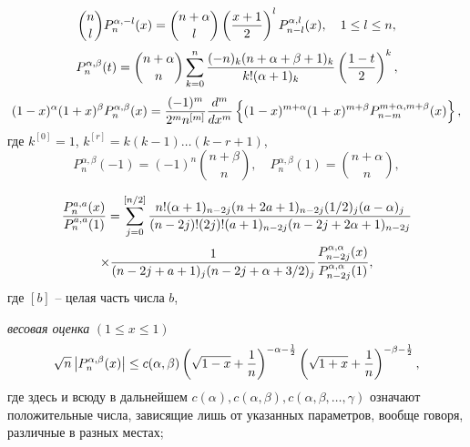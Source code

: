  \begin{equation}\label{Haar-Tcheb-eq5.6}
 {n\choose l}P_n^{\alpha,-l}(x)= {n+\alpha\choose
l}\left({x+1\over2}\right)^lP_{n-l}^{\alpha,l}(x),
     \quad 1\le l \le n,
\end{equation}
\begin{equation}\label{Haar-Tcheb-eq5.7}
P_n^{\alpha,\beta}(t) ={n+\alpha\choose n}
\sum_{k=0}^n{(-n)_k(n+\alpha+\beta+1)_k\over k!(\alpha+1)_k}
\left({1-t\over 2}\right)^k,
\end{equation}
\begin{equation}\label{Haar-Tcheb-eq5.8}
(1-x)^\alpha(1+x)^\beta P_n^{\alpha,\beta}(x)
={(-1)^m\over2^mn^{[m]}}{d^m\over dx^m}
\left\{(1-x)^{m+\alpha}(1+x)^{m+\beta} P_{n-m}^{m+\alpha,m+\beta}(x)
\right\},
\end{equation}
где $k^{[0]}=1$, $k^{[r]}=k(k-1)\dots(k-r+1)$,
\begin{equation}\label{Haar-Tcheb-eq5.9}
P_n^{\alpha,\beta}(-1)=(-1)^n {n+\beta\choose n},\quad P_n^{\alpha,\beta}(1)= {n+\alpha\choose n},
\end{equation}

$$
{P_n^{a,a}(x)\over P_n^{a,a}(1)}=\sum_{j=0}^{[n/2]}
   { n!(\alpha+1)_{n-2j}(n+2a+1)_{n-2j}(1/2)_j(a-\alpha)_j
    \over (n-2j)!(2j)!(a+1)_{n-2j}(n-2j+2\alpha+1)_{n-2j}}
     $$
\begin{equation}\label{Haar-Tcheb-eq5.10}
    \times{1\over (n-2j+a+1)_j(n-2j+\alpha+3/2)_j}
     {P_{n-2j}^{\alpha,\alpha}(x)\over
P_{n-2j}^{\alpha,\alpha}(1)},
\end{equation}
где $[b]$ -- целая часть числа $b$,

\textit{весовая оценка} $(1\le x\le1)$
\begin{equation}\label{sob-jac-discrete-eq2.11}
\sqrt{n}\left| P_n^{\alpha,\beta}(x)\right|\le c(\alpha,\beta)
\left(\sqrt{1-x}+{1\over n}\right)^{-\alpha-{1\over2}}
\left(\sqrt{1+x}+{1\over n}\right)^{-\beta-{1\over2}},
\end{equation}
где здесь и всюду в дальнейшем
$c(\alpha),c(\alpha,\beta),c(\alpha,\beta,\dots,\gamma)$ означают
положительные числа, зависящие лишь от указанных параметров, вообще
говоря, различные в разных местах;

